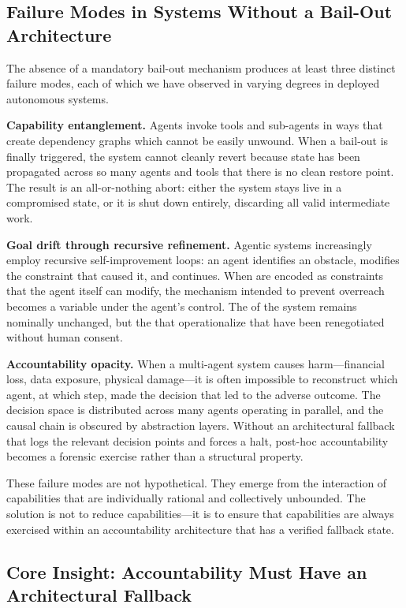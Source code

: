 \subsection{Failure Modes in Systems Without a Bail-Out Architecture}

The absence of a mandatory bail-out mechanism produces at least three distinct failure modes, each of which we have observed in varying degrees in deployed autonomous systems.

\textbf{Capability entanglement.} Agents invoke tools and sub-agents in ways that create dependency graphs which cannot be easily unwound. When a bail-out is finally triggered, the system cannot cleanly revert because state has been propagated across so many agents and tools that there is no clean restore point. The result is an all-or-nothing abort: either the system stays live in a compromised state, or it is shut down entirely, discarding all valid intermediate work.

\textbf{Goal drift through recursive refinement.} Agentic systems increasingly employ recursive self-improvement loops: an agent identifies an obstacle, modifies the constraint that caused it, and continues. When \bounds are encoded as constraints that the agent itself can modify, the mechanism intended to prevent overreach becomes a variable under the agent's control. The \purpose of the system remains nominally unchanged, but the \bounds that operationalize that \purpose have been renegotiated without human consent.

\textbf{Accountability opacity.} When a multi-agent system causes harm—financial loss, data exposure, physical damage—it is often impossible to reconstruct which agent, at which step, made the decision that led to the adverse outcome. The decision space is distributed across many agents operating in parallel, and the causal chain is obscured by abstraction layers. Without an architectural fallback that logs the relevant decision points and forces a halt, post-hoc accountability becomes a forensic exercise rather than a structural property.

These failure modes are not hypothetical. They emerge from the interaction of capabilities that are individually rational and collectively unbounded. The solution is not to reduce capabilities—it is to ensure that capabilities are always exercised within an accountability architecture that has a verified fallback state.

\subsection{Core Insight: Accountability Must Have an Architectural Fallback}

